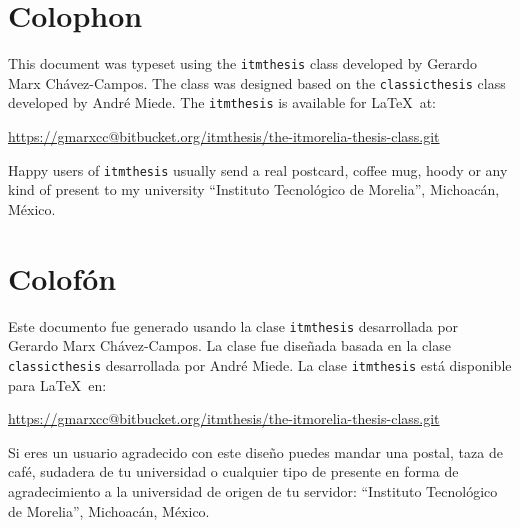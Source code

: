 
\pagestyle{empty}
\hfill
\vfill
{}
\section*{Colophon}

This document was typeset using the  \texttt{itmthesis} class developed by Gerardo Marx Chávez-Campos. The class was designed based on the \texttt{classicthesis} class developed by Andr\'e Miede. The \texttt{itmthesis} is available for \LaTeX\ at: 

\begin{center}
\url{https://gmarxcc@bitbucket.org/itmthesis/the-itmorelia-thesis-class.git}
\end{center}

\noindent Happy users of \texttt{itmthesis} usually send a real postcard, coffee mug, hoody or any kind of present to my university ``Instituto Tecnológico de Morelia'', Michoacán, México.


\section*{Colofón}

Este documento fue generado usando la clase \texttt{itmthesis} desarrollada por Gerardo Marx Chávez-Campos. La clase fue diseñada basada en la clase \texttt{classicthesis} desarrollada por Andr\'e Miede. La clase \texttt{itmthesis} está disponible para \LaTeX\ en: 

\begin{center}
\url{https://gmarxcc@bitbucket.org/itmthesis/the-itmorelia-thesis-class.git}
\end{center}

\noindent Si eres un usuario agradecido con este diseño puedes mandar una postal, taza de café, sudadera de tu universidad o cualquier tipo de presente en forma de agradecimiento a la universidad de origen de tu servidor: ``Instituto Tecnológico de Morelia'', Michoacán, México.